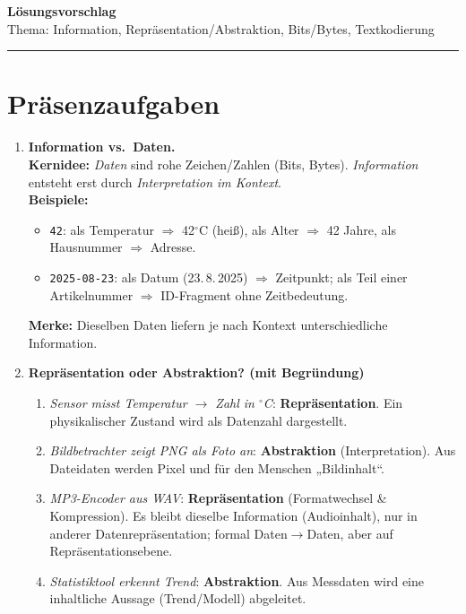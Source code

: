 \documentclass[11pt,a4paper]{scrartcl}
\newcommand{\sheettitle}[2]{%
	{\Large\bfseries #1}\\[-0.2em]
	{\normalsize #2}\par\hrule\vspace{1.0em}
}
\begin{document}
	
	\sheettitle{Lösungsvorschlag}{Thema: Information, Repräsentation/Abstraktion, Bits/Bytes, Textkodierung}
	
	\section*{Präsenzaufgaben}
	
	\begin{enumerate}[leftmargin=*,label=\textbf{Aufgabe~\arabic*:}, itemsep=0.9em]
		
		\item \textbf{Information vs.\ Daten.}\\
		\textbf{Kernidee:} \emph{Daten} sind rohe Zeichen/Zahlen (Bits, Bytes). \emph{Information} entsteht erst durch \emph{Interpretation im Kontext}.\\
		\textbf{Beispiele:}
		\begin{itemize}
			\item \texttt{42}: als Temperatur \(\Rightarrow\) 42\(^\circ\)C (heiß), als Alter \(\Rightarrow\) 42 Jahre, als Hausnummer \(\Rightarrow\) Adresse.
			\item \texttt{2025-08-23}: als Datum (23.\,8.\,2025) \(\Rightarrow\) Zeitpunkt; als Teil einer Artikelnummer \(\Rightarrow\) ID-Fragment ohne Zeitbedeutung.
		\end{itemize}
		\textbf{Merke:} Dieselben Daten liefern je nach Kontext unterschiedliche Information.
		
		\item \textbf{Repräsentation oder Abstraktion? (mit Begründung)}
		\begin{enumerate}[label*=\alph*)]
			\item \emph{Sensor misst Temperatur \(\rightarrow\) Zahl in \(^\circ\)C}: \textbf{Repräsentation}. Ein physikalischer Zustand wird als Datenzahl dargestellt.
			\item \emph{Bildbetrachter zeigt PNG als Foto an}: \textbf{Abstraktion} (Interpretation). Aus Dateidaten werden Pixel und für den Menschen „Bildinhalt“.
			\item \emph{MP3-Encoder aus WAV}: \textbf{Repräsentation} (Formatwechsel \& Kompression). Es bleibt dieselbe Information (Audioinhalt), nur in anderer Datenrepräsentation; formal Daten\(\to\)Daten, aber auf Repräsentations\-ebene.
			\item \emph{Statistiktool erkennt Trend}: \textbf{Abstraktion}. Aus Messdaten wird eine inhaltliche Aussage (Trend/Modell) abgeleitet.
		\end{enumerate}
		

\end{enumerate}
\end{document}
